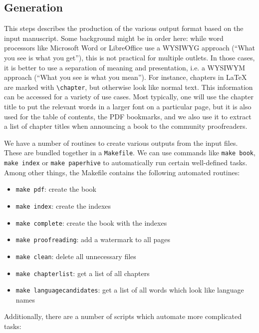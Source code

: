 \documentclass[guidelines,nonflat,modfonts] {langsci/langscibook}
\begin{document}
\subsection{Generation}
This steps describes the production of the various output format based on the input manuscript. Some background might be in order here: while word processors like Microsoft Word or LibreOffice use a WYSIWYG approach (``What you see is what you get''), this is not practical for multiple outlets.
In those cases, it is better to use a separation of meaning and presentation, i.e. a WYSIWYM approach (``What you see is what you mean''). For instance, chapters in \LaTeX\xspace are marked with \verb+\chapter+, but otherwise look like normal text. This information can be accessed for a variety of use cases. Most typically, one will use the chapter title to put the relevant words in a larger font on a particular  page, but it is also used for the table of contents, the PDF bookmarks, and we also use it to extract a list of chapter titles when announcing a book to the community proofreaders. 

We have a number of routines to create various outputs from the input files. These are bundled together in a \verb+Makefile+. We can use commands like \verb+make book+, \verb+make index+ or \verb+make paperhive+ to automatically run certain well-defined tasks. Among other things, the Makefile contains the following automated routines: 

\begin{itemize}
 \item \texttt{make pdf}: create the book 
 \item \texttt{make index}: create the indexes
 \item \texttt{make complete}: create the book with the indexes 
 \item \texttt{make proofreading}: add a watermark to all pages 
 \item \texttt{make clean}: delete all unnecessary files 
 \item \texttt{make chapterlist}: get a list of all chapters 
 \item \texttt{make languagecandidates}: get a list of all words which look like language names
\end{itemize}

Additionally, there are a number of scripts which automate more complicated tasks: 
\end{document}
